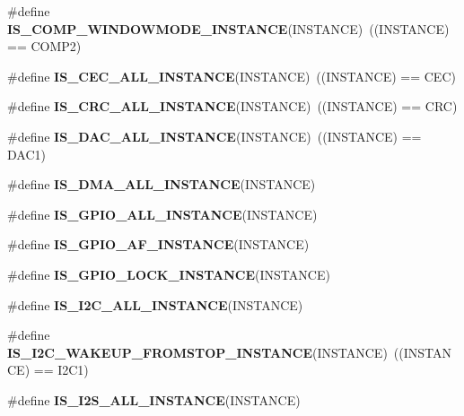 \begin{DoxyCompactItemize}
\item 
\mbox{\label{group___exported__macro_gab7f78e841f84bf7ec834748ca685fbc0}} 
\#define {\bfseries I\+S\+\_\+\+C\+O\+M\+P\+\_\+\+W\+I\+N\+D\+O\+W\+M\+O\+D\+E\+\_\+\+I\+N\+S\+T\+A\+N\+CE}(I\+N\+S\+T\+A\+N\+CE)~((I\+N\+S\+T\+A\+N\+CE) == C\+O\+M\+P2)
\item 
\mbox{\label{group___exported__macro_ga10cad35fdea5ffcb9f17973ce98c7dee}} 
\#define {\bfseries I\+S\+\_\+\+C\+E\+C\+\_\+\+A\+L\+L\+\_\+\+I\+N\+S\+T\+A\+N\+CE}(I\+N\+S\+T\+A\+N\+CE)~((I\+N\+S\+T\+A\+N\+CE) == C\+EC)
\item 
\mbox{\label{group___exported__macro_gaa514941a7f02f65eb27450c05e4e8dd1}} 
\#define {\bfseries I\+S\+\_\+\+C\+R\+C\+\_\+\+A\+L\+L\+\_\+\+I\+N\+S\+T\+A\+N\+CE}(I\+N\+S\+T\+A\+N\+CE)~((I\+N\+S\+T\+A\+N\+CE) == C\+RC)
\item 
\mbox{\label{group___exported__macro_ga94426b97cc5f1644d67f291cbcdba6d8}} 
\#define {\bfseries I\+S\+\_\+\+D\+A\+C\+\_\+\+A\+L\+L\+\_\+\+I\+N\+S\+T\+A\+N\+CE}(I\+N\+S\+T\+A\+N\+CE)~((I\+N\+S\+T\+A\+N\+CE) == D\+A\+C1)
\item 
\#define {\bfseries I\+S\+\_\+\+D\+M\+A\+\_\+\+A\+L\+L\+\_\+\+I\+N\+S\+T\+A\+N\+CE}(I\+N\+S\+T\+A\+N\+CE)
\item 
\#define {\bfseries I\+S\+\_\+\+G\+P\+I\+O\+\_\+\+A\+L\+L\+\_\+\+I\+N\+S\+T\+A\+N\+CE}(I\+N\+S\+T\+A\+N\+CE)
\item 
\#define {\bfseries I\+S\+\_\+\+G\+P\+I\+O\+\_\+\+A\+F\+\_\+\+I\+N\+S\+T\+A\+N\+CE}(I\+N\+S\+T\+A\+N\+CE)
\item 
\#define {\bfseries I\+S\+\_\+\+G\+P\+I\+O\+\_\+\+L\+O\+C\+K\+\_\+\+I\+N\+S\+T\+A\+N\+CE}(I\+N\+S\+T\+A\+N\+CE)
\item 
\#define {\bfseries I\+S\+\_\+\+I2\+C\+\_\+\+A\+L\+L\+\_\+\+I\+N\+S\+T\+A\+N\+CE}(I\+N\+S\+T\+A\+N\+CE)
\item 
\mbox{\label{group___exported__macro_gadf692bda16bac3264bccff7f59ddaab9}} 
\#define {\bfseries I\+S\+\_\+\+I2\+C\+\_\+\+W\+A\+K\+E\+U\+P\+\_\+\+F\+R\+O\+M\+S\+T\+O\+P\+\_\+\+I\+N\+S\+T\+A\+N\+CE}(I\+N\+S\+T\+A\+N\+CE)~((I\+N\+S\+T\+A\+N\+CE) == I2\+C1)
\item 
\#define {\bfseries I\+S\+\_\+\+I2\+S\+\_\+\+A\+L\+L\+\_\+\+I\+N\+S\+T\+A\+N\+CE}(I\+N\+S\+T\+A\+N\+CE)

\end{DoxyCompactItemize}
